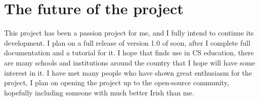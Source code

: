 \section{The future of the project}

This project has been a passion project for me, and I fully intend to continue its development. I plan on a full release of version 1.0 of \Setanta{} soon, after I complete full documentation and a tutorial for it.
I hope that \Setanta{} finds use in CS education, there are many schools and institutions around the country that I hope will have some interest in it. I have met many people who have shown great enthusiasm for the project, I plan on opening the project up to the open-source community, hopefully including someone with much better Irish than me.
